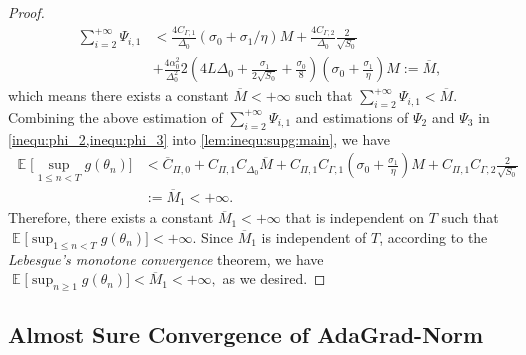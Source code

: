 \documentclass[standalone]{article}
\DeclareMathOperator{\Expect}{\mathbb{E}}
\begin{document}
\begin{proof}
\begin{equation}
\begin{aligned}
\sum_{i=2}^{+\infty}\Psi_{i,1}&< \frac{4C_{\Gamma,1}}{\Delta_0}\left(\sigma_0 + \sigma_1/\eta \right) M + \frac{4C_{\Gamma,2}}{\Delta_0}\frac{2}{\sqrt{S_0}}\\& + \frac{4\alpha_0^2}{\Delta_0^2} 2\left(4 L\Delta_0+\frac{\sigma_{1}}{2\sqrt{S_{0}}}+\frac{\sigma_{0}}{8}\right) \left(\sigma_0 + \frac{\sigma_1}{\eta} \right)M :=\overline{M},
\end{aligned}\end{equation}
which means there exists a constant $\overline{M} < +\infty$ such that $\sum_{i=2}^{+\infty}\Psi_{i,1}<\overline{M}$.
Combining the above estimation of $\sum_{i=2}^{+\infty}\Psi_{i,1}$ and estimations of $\Psi_2$ and $\Psi_3$ in \cref{inequ:phi_2,inequ:phi_3} into \cref{lem:inequ:supg:main}, we have 
\begin{equation}\nonumber\begin{aligned}
\Expect\Big[\sup_{1\le n<T}g(\theta_{n})\Big]&< \overline{C}_{\Pi,0} + C_{\Pi,1}C_{\Delta_0} \overline{M} + C_{\Pi,1}C_{\Gamma,1}\left(\sigma_0 + \frac{\sigma_1}{\eta} \right)M + C_{\Pi,1}C_{\Gamma,2} \frac{2}{\sqrt{S_0}}\\&:=\overline{M}_{1}<+\infty.
\end{aligned}\end{equation}
Therefore, there exists a constant $\overline{M}_{1} < +\infty$ that is independent on $T$ such that $\Expect\Big[\sup_{1\le n<T}g(\theta_{n})\Big]<+\infty$.
Since \(\overline{M}_{1}\) is independent of \(T\), according to the \emph{ Lebesgue's monotone convergence} theorem, we have $\Expect\Big[\sup_{n\ge 1}g(\theta_{n})\Big]<\overline{M}_{1}<+\infty,$ as we desired.
\end{proof}




\subsection{Almost Sure Convergence of AdaGrad-Norm}\label{subsec:almost:sure}
\end{document}
